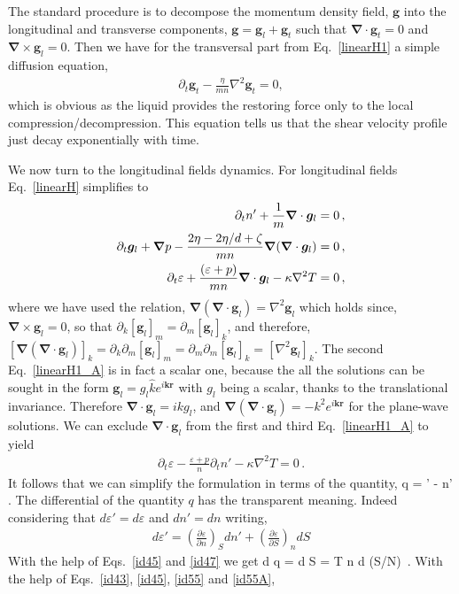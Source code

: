 The standard procedure is to decompose the momentum density field, $\bm{g}$ into the longitudinal and transverse components,
$\bm{g} = \bm{g}_l + \bm{g}_t$ such that $\bm{\nabla} \cdot \bm{g}_t = 0$ and $\bm{\nabla} \times \bm{g}_l = 0$.
Then we have for the transversal part from Eq.~\eqref{linearH1} a simple diffusion equation,
\begin{align}\label{linearH2}
 \partial_t  \bm{g}_t -\frac{ \eta}{mn} \nabla^2 \bm{g}_t = 0,
\end{align}
which is obvious as the liquid provides the restoring force only to the local compression/decompression.
This equation tells us that the shear velocity profile just decay exponentially with time.

We now turn to the longitudinal fields dynamics. 
For longitudinal fields Eq.~\eqref{linearH} simplifies to
\begin{align}\label{linearH1_A}
\partial_t n' + \frac{1}{m} \bm{\nabla} \cdot \bm{g}_l =0\, ,
\notag \\
\partial_t  \bm{g}_l + \bm{\nabla}  p  -\frac{2\eta -2\eta / d + \zeta}{ mn } \bm{\nabla} (\bm{\nabla} \cdot \bm{g}_l ) =0\, ,%
\notag \\
\partial_t \varepsilon +  \frac{\left( \varepsilon + p \right)}{mn} \bm{\nabla}\cdot  \bm{g}_l - \kappa \nabla^2 T =0\, ,
\end{align}
where we have used the relation, $\bm{\nabla} (\bm{\nabla} \cdot \bm{g}_l ) = \nabla^2 \bm{g}_l$ which holds since,
$\bm{\nabla} \times \bm{g}_l=0$, so that $\partial_k [\bm{g}_l]_m = \partial_m [\bm{g}_l]_k$, and therefore,
$[\bm{\nabla} (\bm{\nabla} \cdot \bm{g}_l ) ]_k = \partial_k \partial_m  [\bm{g}_l ]_m = \partial_m \partial_m  [\bm{g}_l]_k = [\nabla^2 \bm{g}_l]_k$.
The second Eq.~\eqref{linearH1_A} is in fact a scalar one, because the all the solutions can be sought in the form $\bm{g}_l  = g_l \hat{k} e^{i \bm{k} \bm{r}}$ with $g_l$ being a scalar, thanks to the translational invariance.
Therefore $\bm{\nabla} \cdot \bm{g}_l = i k g_l$, and $\bm{\nabla} (\bm{\nabla} \cdot \bm{g}_l ) = - k^2 e^{i \bm{k} \bm{r}}$ for the plane-wave solutions.
We can exclude $\bm{\nabla} \cdot \bm{g}_l$ from the first and third Eq.~\eqref{linearH1_A} to yield
\begin{align}\label{linearH1_B}
\partial_t \varepsilon - \frac{ \varepsilon + p}{ n } \partial_t n' - \kappa \nabla^2 T =0\, .
\end{align}
It follows that we can simplify the formulation in terms of the quantity,
\be\label{q}
q = \varepsilon' -  n'\, .
\ee
The differential of the quantity $q$ has the transparent meaning.
Indeed considering that $d \varepsilon' = d \varepsilon$ and $d n' = d n$ writing,
\begin{align}
d \varepsilon'  = \left( \frac{ \partial \varepsilon }{ \partial n} \right)_S d n' + \left( \frac{ \partial \varepsilon }{ \partial S} \right)_n d S
\end{align}
With the help of Eqs.~\eqref{id45} and \eqref{id47} we get
\be\label{dq}
d q =   d S = T n d (S/N)\, .
\ee
With the help of Eqs.~\eqref{id43}, \eqref{id45}, \eqref{id55} and \eqref{id55A},

